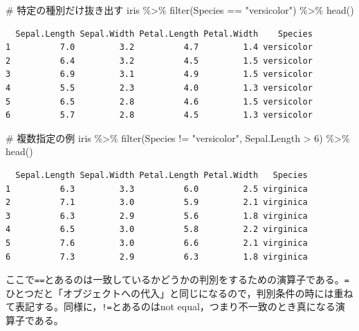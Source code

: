 \documentclass[
  a4paper,
]{ltjsbook}
\newenvironment{Shaded}{\begin{snugshade}}{\end{snugshade}}
\newcommand{\CommentTok}[1]{\textcolor[rgb]{0.37,0.37,0.37}{#1}}
\newcommand{\DecValTok}[1]{\textcolor[rgb]{0.68,0.00,0.00}{#1}}
\newcommand{\FunctionTok}[1]{\textcolor[rgb]{0.28,0.35,0.67}{#1}}
\newcommand{\NormalTok}[1]{\textcolor[rgb]{0.00,0.23,0.31}{#1}}
\newcommand{\SpecialCharTok}[1]{\textcolor[rgb]{0.37,0.37,0.37}{#1}}
\newcommand{\StringTok}[1]{\textcolor[rgb]{0.13,0.47,0.30}{#1}}
\begin{document}
\begin{Shaded}
\begin{Highlighting}[]
\CommentTok{\# 特定の種別だけ抜き出す}
\NormalTok{iris }\SpecialCharTok{\%\textgreater{}\%} \FunctionTok{filter}\NormalTok{(Species }\SpecialCharTok{==} \StringTok{"versicolor"}\NormalTok{) }\SpecialCharTok{\%\textgreater{}\%} \FunctionTok{head}\NormalTok{()}
\end{Highlighting}
\end{Shaded}

\begin{verbatim}
  Sepal.Length Sepal.Width Petal.Length Petal.Width    Species
1          7.0         3.2          4.7         1.4 versicolor
2          6.4         3.2          4.5         1.5 versicolor
3          6.9         3.1          4.9         1.5 versicolor
4          5.5         2.3          4.0         1.3 versicolor
5          6.5         2.8          4.6         1.5 versicolor
6          5.7         2.8          4.5         1.3 versicolor
\end{verbatim}

\begin{Shaded}
\begin{Highlighting}[]
\CommentTok{\# 複数指定の例}
\NormalTok{iris }\SpecialCharTok{\%\textgreater{}\%} \FunctionTok{filter}\NormalTok{(Species }\SpecialCharTok{!=} \StringTok{"versicolor"}\NormalTok{, Sepal.Length }\SpecialCharTok{\textgreater{}} \DecValTok{6}\NormalTok{) }\SpecialCharTok{\%\textgreater{}\%} \FunctionTok{head}\NormalTok{()}
\end{Highlighting}
\end{Shaded}

\begin{verbatim}
  Sepal.Length Sepal.Width Petal.Length Petal.Width   Species
1          6.3         3.3          6.0         2.5 virginica
2          7.1         3.0          5.9         2.1 virginica
3          6.3         2.9          5.6         1.8 virginica
4          6.5         3.0          5.8         2.2 virginica
5          7.6         3.0          6.6         2.1 virginica
6          7.3         2.9          6.3         1.8 virginica
\end{verbatim}

ここで\texttt{==}とあるのは一致しているかどうかの判別をするための演算子である。\texttt{=}ひとつだと「オブジェクトへの代入」と同じになるので，判別条件の時には重ねて表記する。同様に，\texttt{!=}とあるのはnot
equal，つまり不一致のとき真になる演算子である。
\end{document}
